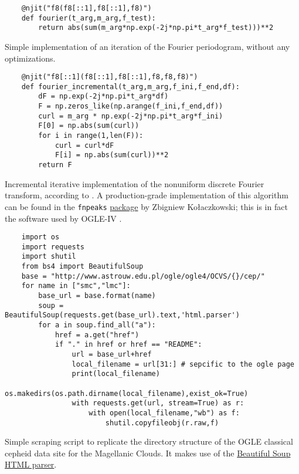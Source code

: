 \begin{listing}
	\begin{verbatim}
	@njit("f8(f8[::1],f8[::1],f8)")
	def fourier(t_arg,m_arg,f_test):
	    return abs(sum(m_arg*np.exp(-2j*np.pi*t_arg*f_test)))**2
	\end{verbatim}
	\caption[Naive implementation of the Fourier periodogram]{
		Simple implementation of an iteration of the Fourier periodogram, without any optimizations.
	}
	\label{lst:fourier-single}
\end{listing}

\begin{listing}
	\begin{verbatim}
	@njit("f8[::1](f8[::1],f8[::1],f8,f8,f8)")
	def fourier_incremental(t_arg,m_arg,f_ini,f_end,df):
	    dF = np.exp(-2j*np.pi*t_arg*df)
	    F = np.zeros_like(np.arange(f_ini,f_end,df))
	    curl = m_arg * np.exp(-2j*np.pi*t_arg*f_ini)
	    F[0] = np.abs(sum(curl))
	    for i in range(1,len(F)):
	        curl = curl*dF
	        F[i] = np.abs(sum(curl))**2
	    return F
	\end{verbatim}
	\caption[Incremental iterative implementation of the Fourier Periodogram]{
		Incremental iterative implementation of the nonuniform discrete Fourier transform, according to \cite{Kurtz1985}.
		A production-grade implementation of this algorithm can be found in the \texttt{fnpeaks} 
		\href{http://helas.astro.uni.wroc.pl/deliverables.php?lang=en&active=fnpeaks}{package} by Zbigniew Kołaczkowski;
		this is in fact the software used by OGLE-IV \citep{OGLE2016}.
	}
	\label{lst:fourier}
\end{listing}



\begin{listing}
	\begin{verbatim}
	import os
	import requests
	import shutil
	from bs4 import BeautifulSoup
	base = "http://www.astrouw.edu.pl/ogle/ogle4/OCVS/{}/cep/"
	for name in ["smc","lmc"]:
	    base_url = base.format(name)
	    soup = BeautifulSoup(requests.get(base_url).text,'html.parser')
	    for a in soup.find_all("a"):
	        href = a.get("href")
	        if "." in href or href == "README":
	            url = base_url+href
	            local_filename = url[31:] # sepcific to the ogle page
	            print(local_filename)
	            os.makedirs(os.path.dirname(local_filename),exist_ok=True)
	            with requests.get(url, stream=True) as r:
	                with open(local_filename,"wb") as f:
	                    shutil.copyfileobj(r.raw,f)
	\end{verbatim}
	\caption[OGLE data download script]{
		Simple scraping script to replicate the directory structure of the OGLE classical cepheid data site for the Magellanic Clouds.
		It makes use of the \href{https://www.crummy.com/software/BeautifulSoup/}{Beautiful Soup HTML parser}.
	}
	\label{lst:download}
\end{listing}


